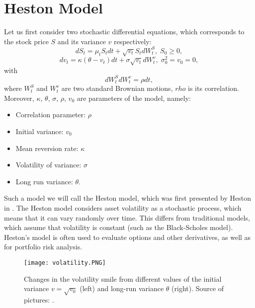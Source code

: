 \documentclass[12pt,a4paper]{report}
\theoremstyle{definition}
\begin{document}
\section{Heston Model}



Let us first consider two stochastic differential equations, which  corresponds to the stock price $S$ and its variance $v$ respectively:
\begin{equation}
	dS_t=\mu_t S_t dt+ \sqrt{v_t} S_tdW_t^S, \; S_0 \geq 0,
\end{equation}
\begin{equation}
	dv_t=\kappa(\theta - v_t) dt + \sigma\sqrt{v_t}dW_t^v, \; \sigma_0^2=v_0=0,
\end{equation}
with 
\begin{equation}
	dW_t^S dW_t^v=\rho dt,
\end{equation}
where $W_t^S$ and $W_t^v$ are two standard Brownian motions, $rho$ is its correlation. Moreover, $\kappa$, $\theta$, $\sigma$, $\rho$, $v_0$ are parameters of the model, namely:

	\begin{itemize}
	\item Correlation parameter: $\rho$
	\item Initial variance: $v_0$
	\item Mean reversion rate: $\kappa$
	\item Volatility of variance: $\sigma$
	\item Long run variance: $\theta$.	
	\end{itemize}

Such a model we will call the Heston model, which was first presented by Heston in \parencite{heston1993closed}. The Heston model considers asset volatility as a stochastic process, which means that it can vary randomly over time. This differs from traditional models, which assume that volatility is constant (such as the Black-Scholes model). Heston's model is often used to evaluate options and other derivatives, as well as for portfolio risk analysis.

\begin{figure}[!htbp]
	\texttt{[image: volatility.PNG]}
	\caption{Changes in the volatility smile from different values of the initial variance $v=\sqrt{v_0}$ (left) and long-run variance $\theta$ (right). Source of pictures: \parencite{gauthier2009fitting}.}
	\label{Fig3.1}
\end{figure}
\end{document}
